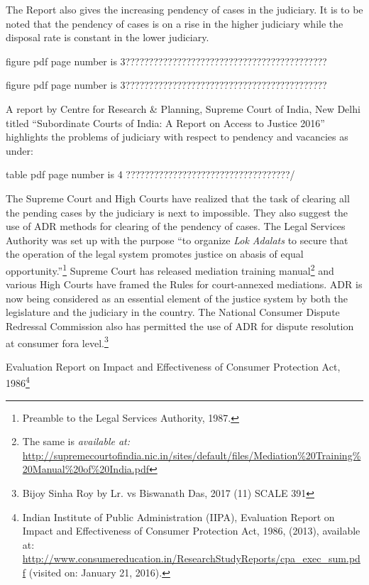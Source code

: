 \begin{multicols}{2}
\noi
The Report also gives the increasing pendency of cases in the judiciary. It is to be noted that
the pendency of cases is on a rise in the higher judiciary while the disposal rate is constant in
the lower judiciary.


\noi
figure pdf page number is 3???????????????????????????????????????????


\noi
figure pdf page number is 3???????????????????????????????????????????

\noi
A report by Centre for Research \& Planning, Supreme Court of India, New Delhi titled
“Subordinate Courts of India: A Report on Access to Justice 2016” highlights the problems of
judiciary with respect to pendency and vacancies as under:

\noi
table pdf page number is 4 ???????????????????????????????????/

\noi
The Supreme Court and High Courts have realized that the task of clearing all the pending cases
by the judiciary is next to impossible. They also suggest the use of ADR methods for clearing
of the pendency of cases. The Legal Services Authority was set up with the purpose “to
organize \textit{Lok Adalats} to secure that the operation of the legal system promotes justice on abasis
of equal opportunity.”\footnote{Preamble to the Legal Services Authority, 1987.} Supreme Court has released mediation training manual\footnote{The same is \textit{available at:} \url{http://supremecourtofindia.nic.in/sites/default/files/Mediation\%20Training\%20Manual\%20of\%20India.pdf}} and various High Courts have framed the Rules for court-annexed mediations. ADR is now being considered as an essential element of the justice system by both the legislature and the judiciary in the country. The National Consumer Dispute Redressal Commission also has permitted the use of ADR for dispute resolution at consumer fora level.\footnote{Bijoy Sinha Roy by Lr. vs Biswanath Das, 2017 (11) SCALE 391}


\noi
Evaluation Report on Impact and Effectiveness of Consumer Protection Act, 1986\footnote{Indian Institute of Public Administration (IIPA), Evaluation Report on Impact and Effectiveness of Consumer  Protection Act, 1986, (2013), available at: \url{http://www.consumereducation.in/ResearchStudyReports/cpa_exec_sum.pdf} (visited on: January 21, 2016).}


\end{multicols}
